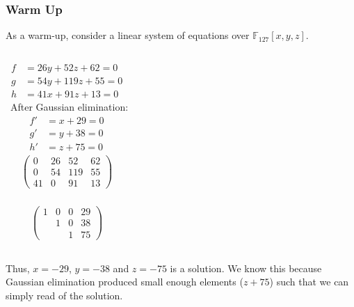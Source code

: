 \documentclass[9pt]{beamer}
\newcommand{\F}[1][]{\ensuremath{\mathbb{F}_{#1}}\xspace}
\begin{document}
\begin{frame}
\frametitle{Warm Up}

As a warm-up, consider a linear system of equations over $\F[127][x,y,z]$.

\begin{columns}
\begin{align*}
f &= 26y + 52z + 62 = 0\\
g &= 54y + 119z + 55 = 0\\
h &= 41x + 91z + 13 = 0
\end{align*}
\ After Gaussian elimination:
\begin{align*}
f' &= x + 29 = 0\\
g' &= y + 38 = 0\\
h' &= z + 75 = 0
\end{align*}
\begin{align*}
\left(\begin{array}{rrrr}
0 & 26 & 52 & 62 \\
0 & 54 & 119 & 55 \\
41 & 0 & 91 & 13
\end{array}\right)
\end{align*}
\ \\
\begin{align*}
\left(\begin{array}{rrrr}
1 & 0 & 0 & 29 \\
  & 1 & 0 & 38 \\
  &   & 1 & 75
\end{array}\right)
\end{align*}
\end{columns}

\vspace{1em}

Thus, $x = -29$, $y = - 38$ and $z = - 75$ is a solution. We know this because Gaussian elimination produced small enough elements ($z + 75$) such that we can simply read of the solution.

\end{frame}
\end{document}
